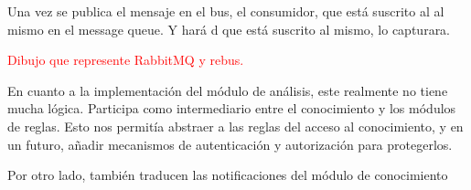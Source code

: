Una vez se publica el mensaje en el bus, el consumidor, que está suscrito al al mismo en el message queue. Y hará d que está suscrito al mismo, lo capturara.

\textcolor{red}{Dibujo que represente RabbitMQ y rebus.}

En cuanto a la implementación del módulo de análisis, este realmente no tiene mucha lógica. Participa como intermediario entre el conocimiento y los módulos de reglas. Esto nos permitía abstraer a las reglas del acceso al conocimiento, y en un futuro, añadir mecanismos de autenticación y autorización para protegerlos.

Por otro lado, también traducen las notificaciones del módulo de conocimiento
